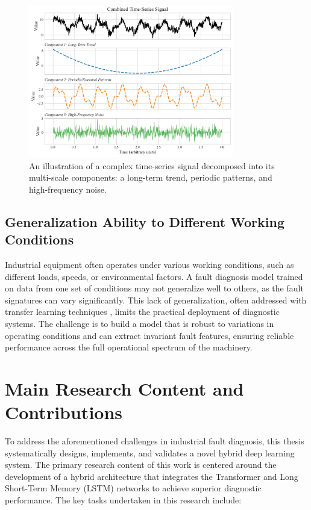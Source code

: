 \begin{figure}[h!]
\centering
\includegraphics[width=0.8\textwidth]{logos/multi_scale_timeseries_decomposition.pdf}
\caption{An illustration of a complex time-series signal decomposed into its multi-scale components: a long-term trend, periodic patterns, and high-frequency noise.}
\label{fig:multi_scale_decomposition}
\end{figure}

\subsection{Generalization Ability to Different Working Conditions}
Industrial equipment often operates under various working conditions, such as different loads, speeds, or environmental factors. A fault diagnosis model trained on data from one set of conditions may not generalize well to others, as the fault signatures can vary significantly. This lack of generalization, often addressed with transfer learning techniques \cite{wen2021review}, limits the practical deployment of diagnostic systems. The challenge is to build a model that is robust to variations in operating conditions and can extract invariant fault features, ensuring reliable performance across the full operational spectrum of the machinery.

\section{Main Research Content and Contributions}
\label{sec:introduction:content_contributions}

To address the aforementioned challenges in industrial fault diagnosis, this thesis systematically designs, implements, and validates a novel hybrid deep learning system. The primary research content of this work is centered around the development of a hybrid architecture that integrates the Transformer and Long Short-Term Memory (LSTM) networks to achieve superior diagnostic performance. The key tasks undertaken in this research include:

